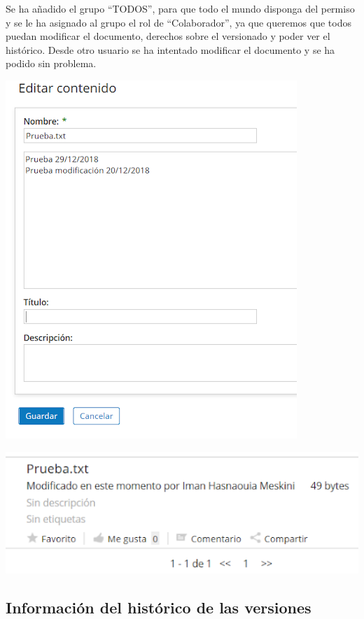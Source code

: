 \documentclass{article}
\begin{document}
Se ha añadido el grupo “TODOS”, para que todo el mundo disponga del permiso y se le ha asignado al grupo el rol de “Colaborador”, ya que queremos que todos puedan modificar el documento, derechos sobre el versionado y poder ver el histórico.
Desde otro usuario se ha intentado modificar el documento y se ha podido sin problema.

\begin{center}
\includegraphics[scale=0.5]{images/mod.png}
\end{center}

\begin{center}
\includegraphics[scale=0.5]{images/mod2.png}
\end{center}

\subsection{Información del histórico de las versiones}
\end{document}
